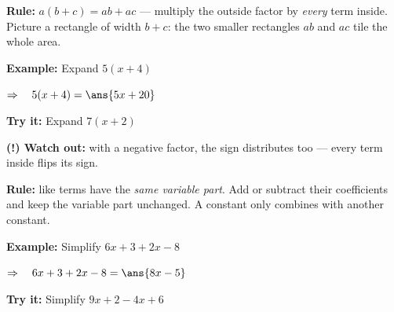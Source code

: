 \documentclass[12pt]{article}
\begin{document}


\begin{formulabox}
\textbf{Rule:} \quad $a(b + c) = ab + ac$ \quad --- multiply the outside factor by
\emph{every} term inside. Picture a rectangle of width $b + c$: the two smaller
rectangles $ab$ and $ac$ tile the whole area.
\end{formulabox}

\begin{examplebox}
\textbf{Example:} \quad Expand $5(x + 4)$

$\Rightarrow\quad 5(x + 4) = \ans{5x + 20}$
\end{examplebox}

\begin{tryitbox}
\textbf{Try it:} \quad Expand $7(x + 2)$\\[2pt]
\end{tryitbox}

\begin{watchoutbox}
\textbf{(!) Watch out:} with a negative factor, the sign distributes too ---
every term inside flips its sign.
\end{watchoutbox}


\begin{formulabox}
\textbf{Rule:} like terms have the \emph{same variable part}. Add or subtract their
coefficients and keep the variable part unchanged. A constant only combines with
another constant.
\end{formulabox}

\begin{examplebox}
\textbf{Example:} \quad Simplify $6x + 3 + 2x - 8$

$\Rightarrow\quad 6x + 3 + 2x - 8 = \ans{8x - 5}$
\end{examplebox}

\begin{tryitbox}
\textbf{Try it:} \quad Simplify $9x + 2 - 4x + 6$\\[2pt]
\end{tryitbox}
\end{document}
